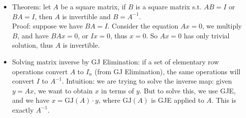 \documentclass{report}
\begin{document}
\begin{itemize}
\item Theorem: let $A$ be a square matrix, if $B$ is a square matrix s.t. $AB = I$ or $BA = I$, then $A$ is invertible and $B = A^{-1}$. \\
Proof: suppose we have $BA = I$. Consider the equation $Ax=0$, we multiply $B$, and have $BAx = 0$, or $Ix = 0$, thus $x=0$. So $Ax=0$ has only trivial solution, thus $A$ is invertible. 

\item Solving matrix inverse by GJ Elimination: if a set of elementary row operations convert $A$ to $I_n$ (from GJ Elimination), the same operations will convert $I$ to $A^{-1}$. Intuition: we are trying to solve the inverse map: given $y = Ax$, we want to obtain $x$ in terms of $y$. But to solve this, we use GJE, and we have $x = \text{GJ}(A)\cdot y$, where $\text{GJ}(A)$ is GJE applied to $A$. This is exactly $A^{-1}$. 
\end{itemize}
\end{document}
